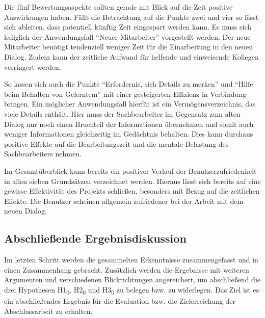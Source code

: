 Die fünf Bewertungsaspekte sollten gerade mit Blick auf die Zeit positive Auswirkungen haben. Fällt die Betrachtung auf die Punkte zwei und vier so lässt sich ableiten, dass potentiell künftig Zeit eingespart werden kann. Es muss sich lediglich der Anwendungsfall \enquote{Neuer Mitarbeiter} vorgestellt werden. Der neue Mitarbeiter benötigt tendenziell weniger Zeit für die Einarbeitung in den neuen Dialog. Zudem kann der zeitliche Aufwand für helfende und einweisende Kollegen verringert werden.

So lassen sich auch die Punkte \enquote{Erfordernis, sich Details zu merken} und \enquote{Hilfe beim Behalten von Gelerntem} mit einer gesteigerten Effizienz in Verbindung bringen. Ein möglicher Anwendungsfall hierfür ist ein Vermögensverzeichnis, das viele Details enthält. Hier muss der Sachbearbeiter im Gegensatz zum alten Dialog nur noch einen Bruchteil der Informationen übernehmen und somit auch weniger Informationen gleichzeitig im Gedächtnis behalten. Dies kann durchaus positive Effekte auf die Bearbeitungszeit und die mentale Belastung des Sachbearbeiters nehmen.

Im Gesamtüberblick kann bereits ein positiver Verlauf der Benutzerzufriedenheit in allen sieben Grundsätzen verzeichnet werden. Hieraus lässt sich bereits auf eine gewisse Effektivität des Projekts schließen, besonders mit Bezug auf die zeitlichen Effekte. Die Benutzer scheinen allgemein zufriedener bei der Arbeit mit dem neuen Dialog.


\subsection{Abschließende Ergebnisdiskussion}
\label{sec:abschliessendeErgebnisdiskussion}
Im letzten Schritt werden die gesammelten Erkenntnisse zusammengefasst und in einen Zusammenhang gebracht. Zusätzlich werden die Ergebnisse mit weiteren Argumenten und verschiedenen Blickrichtungen angereichert, um abschließend die drei Hypothesen H1\textsubscript{0}, H2\textsubscript{0} und H3\textsubscript{0} zu belegen bzw. zu widerlegen. Das Ziel ist es ein abschließendes Ergebnis für die Evaluation bzw. die Zielerreichung der Abschlussarbeit zu erhalten.

